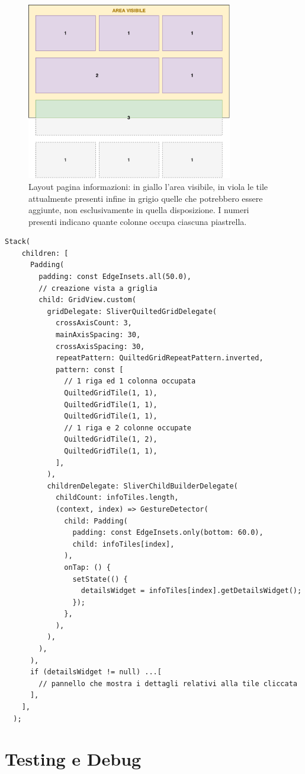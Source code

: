 \begin{figure}
  \centering
  \includegraphics[width=9cm]{img/totem/layout_gridview.png}
  \caption[Layout pagina informazioni]{Layout pagina informazioni: in giallo l'area visibile, in viola le tile attualmente presenti infine in grigio quelle che potrebbero essere aggiunte, non esclusivamente in quella disposizione. I numeri presenti indicano quante colonne occupa ciascuna piastrella.}
  \label{fig:infopageLayout}
\end{figure}

\begin{lstlisting}[style=FlutterStyle, caption={}, label={lst:infoPageCode}]
  Stack(
    children: [
      Padding(
        padding: const EdgeInsets.all(50.0),
        // creazione vista a griglia
        child: GridView.custom(
          gridDelegate: SliverQuiltedGridDelegate(
            crossAxisCount: 3,
            mainAxisSpacing: 30,
            crossAxisSpacing: 30,
            repeatPattern: QuiltedGridRepeatPattern.inverted,
            pattern: const [
              // 1 riga ed 1 colonna occupata
              QuiltedGridTile(1, 1),  
              QuiltedGridTile(1, 1),
              QuiltedGridTile(1, 1),
              // 1 riga e 2 colonne occupate
              QuiltedGridTile(1, 2),
              QuiltedGridTile(1, 1),
            ],
          ),
          childrenDelegate: SliverChildBuilderDelegate(
            childCount: infoTiles.length,
            (context, index) => GestureDetector(
              child: Padding(
                padding: const EdgeInsets.only(bottom: 60.0),
                child: infoTiles[index],
              ),
              onTap: () {
                setState(() {
                  detailsWidget = infoTiles[index].getDetailsWidget();
                });
              },
            ),
          ),
        ),
      ),
      if (detailsWidget != null) ...[
        // pannello che mostra i dettagli relativi alla tile cliccata
      ],
    ],
  );
\end{lstlisting}

\section{Testing e Debug}
